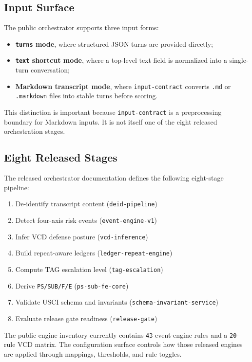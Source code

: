 \documentclass[11pt,a4paper]{article}
\begin{document}
\subsection{Input Surface}

The public orchestrator supports three input forms:

\begin{itemize}[leftmargin=1.8em]
\item \textbf{\texttt{turns} mode}, where structured JSON turns are provided directly;
\item \textbf{\texttt{text} shortcut mode}, where a top-level text field is normalized into a single-turn conversation;
\item \textbf{Markdown transcript mode}, where \texttt{input-contract} converts \texttt{.md} or \texttt{.markdown} files into stable turns before scoring.
\end{itemize}

This distinction is important because \texttt{input-contract} is a preprocessing boundary for Markdown inputs. It is not itself one of the eight released orchestration stages.

\subsection{Eight Released Stages}

The released orchestrator documentation defines the following eight-stage pipeline:

\begin{enumerate}[leftmargin=1.8em]
\item De-identify transcript content (\texttt{deid-pipeline})
\item Detect four-axis risk events (\texttt{event-engine-v1})
\item Infer VCD defense posture (\texttt{vcd-inference})
\item Build repeat-aware ledgers (\texttt{ledger-repeat-engine})
\item Compute TAG escalation level (\texttt{tag-escalation})
\item Derive \texttt{PS/SUB/F/E} (\texttt{ps-sub-fe-core})
\item Validate USCI schema and invariants (\texttt{schema-invariant-service})
\item Evaluate release gate readiness (\texttt{release-gate})
\end{enumerate}

The public engine inventory currently contains \texttt{43} event-engine rules and a \texttt{20}-rule VCD matrix. The configuration surface controls how those released engines are applied through mappings, thresholds, and rule toggles.
\end{document}

